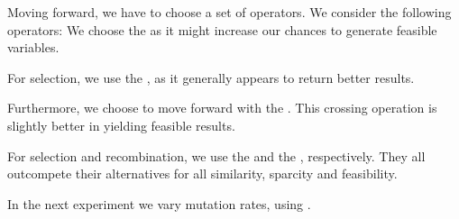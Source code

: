 \documentclass[./../../paper.tex]{subfiles}
\begin{document}
Moving forward, we have to choose a set of operators. We consider the following operators: We choose the  as it might increase our chances to generate feasible variables. 

For selection, we use the , as it generally appears to return better results. 

Furthermore, we choose to move forward with the . This crossing operation is slightly better in yielding feasible results. 

For selection and recombination, we use the  and the , respectively. They all outcompete their alternatives for all similarity, sparcity and feasibility.

In the next experiment we vary mutation rates, using \ModelEVOFSR. 
\end{document}
